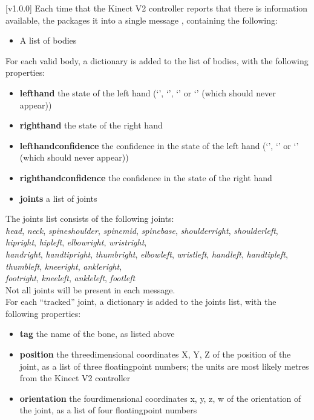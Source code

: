 [v1.0.0]
Each time that the Kinect V2 controller reports that there is information available,
the  packages it into a single message
\openSq{}\closeSq, containing the following:
\begin{itemize}
\item A list of bodies
\end{itemize}

For each valid body, a dictionary \openSq{}\closeSq{} is added to the list
of bodies, with the following properties:
\begin{itemize}
\item\textbf{lefthand} \longDash{} the state of the left hand (`',
`', `' or `' (which should never appear))
\item\exSp\textbf{righthand} \longDash{} the state of the right hand
\item\exSp\textbf{lefthandconfidence} \longDash{} the confidence in the state of the left
hand (`', `' or `' (which should never appear))
\item\exSp\textbf{righthandconfidence} \longDash{} the confidence in the state of the
right hand
\item\exSp\textbf{joints} \longDash{} a list of joints
\end{itemize}

The joints list consists of the following joints:\\
\textbraceleft{} \emph{head}, \emph{neck}, \emph{spineshoulder}, \emph{spinemid},
\emph{spinebase}, \emph{shoulderright}, \emph{shoulderleft}, \emph{hipright},
\emph{hipleft}, \emph{elbowright}, \emph{wristright},\\
\emph{handright}, \emph{handtipright}, \emph{thumbright}, \emph{elbowleft},
\emph{wristleft}, \emph{handleft}, \emph{handtipleft}, \emph{thumbleft}, \emph{kneeright},
\emph{ankleright},\\
\emph{footright}, \emph{kneeleft}, \emph{ankleleft}, \emph{footleft} \textbraceright\\

Not all joints will be present in each message.\\

For each ``tracked'' joint, a dictionary is added to the joints list, with the following
properties:
\begin{itemize}
\item\textbf{tag} \longDash{} the name of the bone, as listed above
\item\exSp\textbf{position} \longDash{} the three\longDash{}dimensional coordinates
\openSq{}X, Y, Z\closeSq{} of the position of the joint, as a list of three
floating\longDash{}point numbers; the units are most likely metres from the Kinect V2
controller
\item\exSp\textbf{orientation} \longDash{} the four\longDash{}dimensional coordinates
\openSq{}x, y, z, w\closeSq{} of the orientation of the joint, as a list of four
floating\longDash{}point numbers
\end{itemize}
\primaryEnd{}
